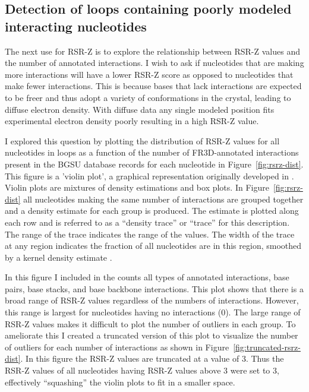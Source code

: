 \subsection{Detection of loops containing poorly modeled interacting nucleotides}

The next use for RSR-Z is to explore the relationship between RSR-Z values and
the number of annotated interactions. I wish to ask if nucleotides that are
making more interactions will have a lower RSR-Z score as opposed to nucleotides
that make fewer interactions. This is because bases that lack interactions are
expected to be freer and thus adopt a variety of conformations in the crystal,
leading to diffuse electron density. With diffuse data any single modeled
position fits experimental electron density poorly resulting in a high RSR-Z
value.

I explored this question by plotting the distribution of RSR-Z values for all
nucleotides in loops as a function of the number of FR3D-annotated interactions
present in the BGSU database records for each nucleotide in
Figure~\ref{fig:rsrz-dist}. This figure is a 'violin plot', a graphical
representation originally developed in \cite{Hintze1998}. Violin plots are
mixtures of density estimations and box plots. In Figure~\ref{fig:rsrz-dist} all
nucleotides making the same number of interactions are grouped together and a
density estimate for each group is produced. The estimate is plotted along each
row and is referred to as a ``density trace'' or ``trace'' for this description.
The range of the trace indicates the range of the values. The width of the trace
at any region indicates the fraction of all nucleotides are in this region,
smoothed by a kernel density estimate \cite{Hintze1998}.

In this figure I included in the counts all types of annotated interactions,
base pairs, base stacks, and base backbone interactions. This plot shows that
there is a broad range of RSR-Z values regardless of the numbers of
interactions. However, this range is largest for nucleotides having no
interactions (0). The large range of RSR-Z values makes it difficult to plot the
number of outliers in each group. To ameliorate this I created a truncated
version of this plot to visualize the number of outliers for each number of
interactions as shown in Figure~\ref{fig:truncated-rsrz-dist}. In this figure
the RSR-Z values are truncated at a value of 3. Thus the RSR-Z values of all
nucleotides having RSR-Z values above 3 were set to 3, effectively ``squashing''
the violin plots to fit in a smaller space.

